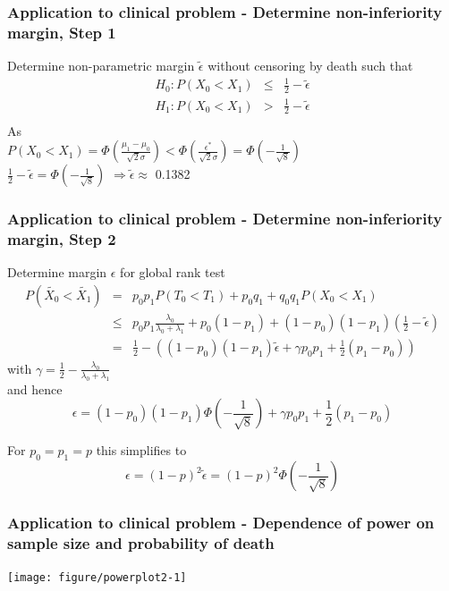 \documentclass[xcolor=pdftex,dvipsnames,table]{beamer}\usepackage[]{graphicx}\usepackage[]{color}
\newenvironment{knitrout}{}{} %
\begin{document}
\begin{frame}[label = slide11b,fragile] %
\frametitle{Application to clinical problem - Determine non-inferiority margin, Step 1}
Determine non-parametric margin $\tilde{\epsilon}$ without censoring by death such that
\begin{eqnarray*}
H_0: P(X_0 < X_1) & \leq  & \frac{1}{2} - \tilde{\epsilon} \\
H_1: P(X_0 < X_1) & >     & \frac{1}{2} - \tilde{\epsilon} \\
\end{eqnarray*}
        As \\
        $P(X_0 < X_1) = \Phi(\frac{\mu_1 - \mu_0}{\sqrt{2}\sigma}) < \Phi(\frac{\epsilon^{*}}{\sqrt{2}\sigma}) = \Phi(-\frac{1}{\sqrt{8}}) $ \\
      $\frac{1}{2} - \tilde{\epsilon} = \Phi(-\frac{1}{\sqrt{8}}) $ 
      $\Rightarrow \tilde{\epsilon} \approx $ 0.1382
\end{frame}

\begin{frame}[label = slide11a,fragile] %
\frametitle{Application to clinical problem - Determine non-inferiority margin, Step 2}
Determine margin $\epsilon$ for global rank test
\begin{eqnarray*}
P(\tilde{X_0}  < \tilde{X_1}) & =    & p_0 p_1 P(T_0 < T_1) + p_0 q_1 + q_0 q_1 P(X_0 < X_1) \\
                              & \leq & \textstyle p_0 p_1 \frac{\lambda_0}{\lambda_0 + \lambda_1} + p_0 (1-p_1)  + (1 - p_0)(1 - p_1)(\frac{1}{2} - \tilde{\epsilon}) \\
                              & = & \frac{1}{2} - \left( (1-p_0)(1-p_1) \tilde{\epsilon} + \gamma p_0 p_1 + \frac{1}{2} (p_1 - p_0) \right)
\end{eqnarray*}
with $ \gamma = \frac{1}{2} - \frac{\lambda_0}{\lambda_0 + \lambda_1} $ \\
and hence \\
$$ \epsilon =  (1-p_0)(1-p_1) \Phi(-\frac{1}{\sqrt{8}}) + \gamma p_0 p_1 + \frac{1}{2} (p_1 - p_0) $$

For $ p_0 = p_1 = p $ this simplifies to \\
 $$\epsilon = (1-p)^2 \tilde{\epsilon} = (1-p)^2 \Phi(-\frac{1}{\sqrt{8}})$$
\end{frame}


\begin{frame}[label=slide12b,fragile] %
\frametitle{Application to clinical problem - Dependence of power on sample size and probability of death}
\begin{knitrout}
\color{fgcolor}
\texttt{[image: figure/powerplot2-1]} 

\end{knitrout}
\end{frame}
\end{document}
